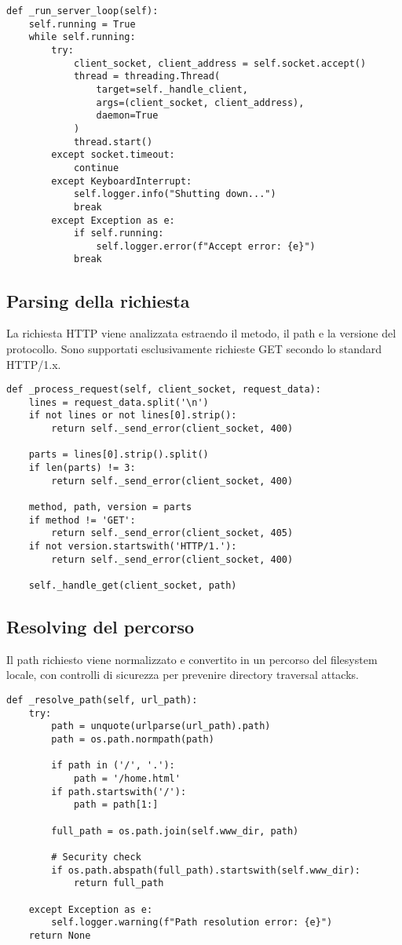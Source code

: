 \documentclass[a4paper,12pt]{report}
\begin{document}
\begin{lstlisting}
def _run_server_loop(self):
    self.running = True
    while self.running:
        try:
            client_socket, client_address = self.socket.accept()
            thread = threading.Thread(
                target=self._handle_client, 
                args=(client_socket, client_address),
                daemon=True
            )
            thread.start()
        except socket.timeout:
            continue
        except KeyboardInterrupt:
            self.logger.info("Shutting down...")
            break
        except Exception as e:
            if self.running:
                self.logger.error(f"Accept error: {e}")
            break
\end{lstlisting}

\subsection{Parsing della richiesta}
La richiesta HTTP viene analizzata estraendo il metodo, il path e la versione del protocollo. Sono supportati esclusivamente richieste GET secondo lo standard HTTP/1.x.

\begin{lstlisting}
def _process_request(self, client_socket, request_data):
    lines = request_data.split('\n')
    if not lines or not lines[0].strip():
        return self._send_error(client_socket, 400)
        
    parts = lines[0].strip().split()
    if len(parts) != 3:
        return self._send_error(client_socket, 400)
        
    method, path, version = parts
    if method != 'GET':
        return self._send_error(client_socket, 405)
    if not version.startswith('HTTP/1.'):
        return self._send_error(client_socket, 400)
        
    self._handle_get(client_socket, path)
\end{lstlisting}

\subsection{Resolving del percorso}
Il path richiesto viene normalizzato e convertito in un percorso del filesystem locale, con controlli di sicurezza per prevenire directory traversal attacks.

\begin{lstlisting}
def _resolve_path(self, url_path):
    try:
        path = unquote(urlparse(url_path).path)
        path = os.path.normpath(path)
        
        if path in ('/', '.'):
            path = '/home.html'
        if path.startswith('/'):
            path = path[1:]
            
        full_path = os.path.join(self.www_dir, path)
        
        # Security check
        if os.path.abspath(full_path).startswith(self.www_dir):
            return full_path
            
    except Exception as e:
        self.logger.warning(f"Path resolution error: {e}")
    return None
\end{lstlisting}
\end{document}
